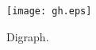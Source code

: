 \documentclass{article}
\begin{document}
\begin{figure}[!htb]
        \centering
        \texttt{[image: gh.eps]}
        \caption{Digraph.}
        \label{fig:digraph}
\end{figure}
\end{document}
